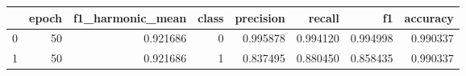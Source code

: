 \begin{tabular}{lrrrrrrr}
\toprule
 & epoch & f1_harmonic_mean & class & precision & recall & f1 & accuracy \\
\midrule
0 & 50 & 0.921686 & 0 & 0.995878 & 0.994120 & 0.994998 & 0.990337 \\
1 & 50 & 0.921686 & 1 & 0.837495 & 0.880450 & 0.858435 & 0.990337 \\
\bottomrule
\end{tabular}
